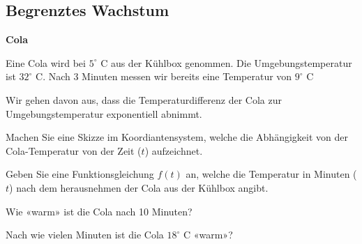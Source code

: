 
\subsection{Begrenztes Wachstum}


\bbwActAufgabenNr{} \textbf{Cola}

Eine Cola wird bei $5^\circ \textrm{ C}$ aus der Kühlbox genommen. Die
Umgebungstemperatur ist $32^\circ \textrm{ C}$. Nach 3 Minuten messen
wir bereits eine Temperatur von $9^\circ \textrm{ C}$ 

Wir gehen davon aus, dass die Temperaturdifferenz der Cola zur
Umgebungstemperatur exponentiell abnimmt.

\begin{bbwAufgabenBlock}
\item Machen Sie eine Skizze im Koordiantensystem, welche die
Abhängigkeit von der Cola-Temperatur von der Zeit ($t$) aufzeichnet.


\item Geben Sie eine Funktionsgleichung $f(t)$ an, welche die
Temperatur in Minuten ($t$) nach dem herausnehmen der Cola aus der Kühlbox
angibt.


\item Wie «warm» ist die Cola nach 10 Minuten?


\item Nach wie vielen Minuten ist die Cola $18^\circ \textrm{ C}$
«warm»?


\end{bbwAufgabenBlock}


\platzFuerBerechnungenBisEndeSeite{}




